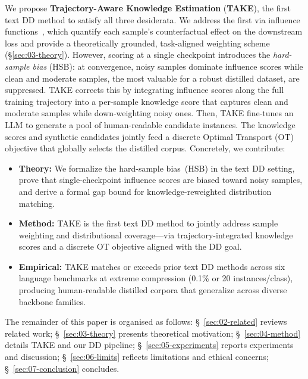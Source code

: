 \begin{foldable} %
  We propose \textbf{Trajectory-Aware Knowledge Estimation} (\textbf{TAKE}), the first text DD method to satisfy all three desiderata.
  We address the first via influence functions~\cite{koh2017understanding}, which quantify each sample's counterfactual effect on the downstream loss and provide a theoretically grounded, task-aligned weighting scheme (\S\ref{sec:03-theory}).
  However, scoring at a single checkpoint introduces the \textit{hard-sample bias} (HSB): at convergence, noisy samples dominate influence scores while clean and moderate samples, the most valuable for a robust distilled dataset, are suppressed.
  TAKE corrects this by integrating influence scores along the full training trajectory into a per-sample knowledge score that captures clean and moderate samples while down-weighting noisy ones.
  Then, TAKE fine-tunes an LLM to generate a pool of human-readable candidate instances.
  The knowledge scores and synthetic candidates jointly feed a discrete Optimal Transport (OT) objective that globally selects the distilled corpus.
  Concretely, we contribute:
  \begin{itemize}
    \item {
        \textbf{Theory:} We formalize the hard-sample bias~(HSB) in the text DD setting, prove that single-checkpoint influence scores are biased toward noisy samples, and derive a formal gap bound for knowledge-reweighted distribution matching.
      }
    \item {
        \textbf{Method:} TAKE is the first text DD method to jointly address sample weighting and distributional coverage---via trajectory-integrated knowledge scores and a discrete OT objective aligned with the DD goal.
      }
    \item {
        \textbf{Empirical:} TAKE matches or exceeds prior text DD methods across six language benchmarks at extreme compression (0.1\% or 20 instances/class), producing human-readable distilled corpora that generalize across diverse backbone families.
      }
  \end{itemize}
\end{foldable}

The remainder of this paper is organised as follows: \S~\ref{sec:02-related} reviews related work; \S~\ref{sec:03-theory} presents theoretical motivation; \S~\ref{sec:04-method} details TAKE and our DD pipeline; \S~\ref{sec:05-experiments} reports experiments and discussion; \S~\ref{sec:06-limits} reflects limitations and ethical concerns; \S~\ref{sec:07-conclusion} concludes.
